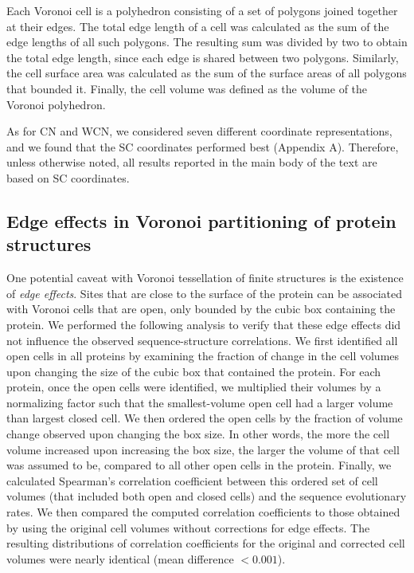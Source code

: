 \documentclass[12pt]{article}
\begin{document}
Each Voronoi cell is a polyhedron consisting of a set of polygons joined together at their edges. The total edge length of a cell was calculated as the sum of the edge lengths of all such polygons. The resulting sum was divided by two to obtain the total edge length, since each edge is shared between two polygons. Similarly, the cell surface area was calculated as the sum of the surface areas of all polygons that bounded it. Finally, the cell volume was defined as the volume of the Voronoi polyhedron.

As for CN and WCN, we considered seven different coordinate representations, and we found that the SC coordinates performed best (Appendix A). Therefore, unless otherwise noted, all results reported in the main body of the text are based on SC coordinates.

\subsection*{Edge effects in Voronoi partitioning of protein structures}

    One potential caveat with Voronoi tessellation of finite structures is the existence of {\it edge effects}. Sites that are close to the surface of the protein can be associated with Voronoi cells that are open, only bounded by the cubic box containing the protein. We performed the following analysis to verify that these edge effects did not influence the observed sequence-structure correlations. We first identified all open cells in all proteins by examining the fraction of change in the cell volumes upon changing the size of the cubic box that contained the protein. For each protein, once the open cells were identified, we multiplied their volumes by a normalizing factor such that the smallest-volume open cell had a larger volume than largest closed cell. We then ordered the open cells by the fraction of volume change observed upon changing the box size. In other words, the more the cell volume increased upon increasing the box size, the larger the volume of that cell was assumed to be, compared to all other open cells in the protein. Finally, we calculated Spearman's correlation coefficient between this ordered set of cell volumes (that included both open and closed cells) and the sequence evolutionary rates. We then compared the computed correlation coefficients to those obtained by using the original cell volumes without corrections for edge effects. The resulting distributions of correlation coefficients for the original and corrected cell volumes were nearly identical (mean difference $<0.001$).
\end{document}
